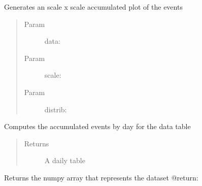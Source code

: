 \documentclass[letterpaper,10pt,english]{sphinxmanual}
\begin{document}
\begin{fulllineitems}
\begin{fulllineitems}
\label{index:SuperHub.Data.Data.contingency}
Generates an scale x scale accumulated plot of the events
\begin{quote}\begin{description}
\item[{Param }] \leavevmode
data:

\item[{Param }] \leavevmode
scale:

\item[{Param }] \leavevmode
distrib:

\end{description}\end{quote}

\end{fulllineitems}


\begin{fulllineitems}
\label{index:SuperHub.Data.Data.daily_table}
Computes the accumulated events by day for the data table
\begin{quote}\begin{description}
\item[{Returns}] \leavevmode
A daily table

\end{description}\end{quote}

\end{fulllineitems}


\begin{fulllineitems}
\label{index:SuperHub.Data.Data.dataset}
\end{fulllineitems}


\begin{fulllineitems}
\label{index:SuperHub.Data.Data.datasethh}
\end{fulllineitems}


\begin{fulllineitems}
\label{index:SuperHub.Data.Data.get_dataset}
Returns the numpy array that represents the dataset
@return:


\end{fulllineitems}
\end{fulllineitems}
\end{document}
